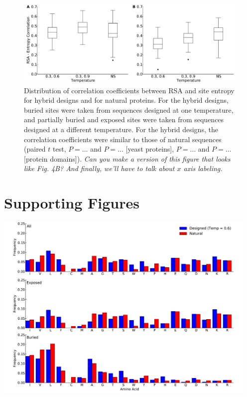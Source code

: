 \documentclass[12pt]{article}
\begin{document}
\begin{figure}[H]
\centerline{\includegraphics[width = 6in]{figures/Combo_Mixed_Temp_Correlation_Plot.pdf}}
\caption{Distribution of correlation coefficients between RSA and site entropy for hybrid designs and for natural proteins. For the hybrid designs, buried sites were taken from sequences designed at one temperature, and partially buried and exposed sites were taken from sequences designed at a different temperature. For the hybrid designs, the correlation coefficients were similar to those of natural sequences ({\color{red}paired $t$ test, $P=\dots$ and $P=\dots$ [yeast proteins], $P=\dots$ and $P=\dots$ [protein domains]}). {\color{red}\emph{ Can you make a version of this figure that looks like Fig. 4B? And finally, we'll have to talk about $x$ axis labeling.}}}
\label{Mixed_RSA_Entropy}
\end{figure}


\cleardoublepage

\section{Supporting Figures}

\centerline{\includegraphics[width = 5in]{figures/Noah_Freq_Combo_Plots_06.pdf}}
\end{document}
